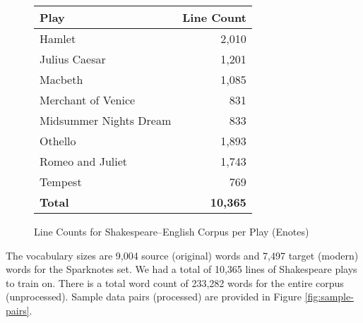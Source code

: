 \documentclass[twoside,twocolumn]{article}
\begin{document}
\begin{figure}[ht]
    \centering
    \begin{tabular}{ |l|r| }
        \hline
        \textbf{Play}
          & \textbf{Line Count} \\
        \hline
        Hamlet & 2,010 \\ \hline
        Julius Caesar & 1,201 \\ \hline
        Macbeth & 1,085 \\ \hline
        Merchant of Venice & 831 \\ \hline
        Midsummer Nights Dream & 833 \\ \hline
        Othello & 1,893 \\ \hline
        Romeo and Juliet & 1,743 \\ \hline
        Tempest & 769 \\ \hline
        \textbf{Total} & \textbf{10,365} \\ \hline
    \end{tabular}
    \caption{Line Counts for Shakespeare--English Corpus per Play (Enotes)}
    \label{fig:data-lines-enotes}
\end{figure}

The vocabulary sizes are 9,004 source (original) words and
7,497 target (modern) words for the Sparknotes set. We had a total of 10,365
lines of Shakespeare plays to train on. There is a total word count of 233,282
words for the entire corpus (unprocessed). Sample data pairs (processed) are
provided in Figure \ref{fig:sample-pairs}.
\end{document}
